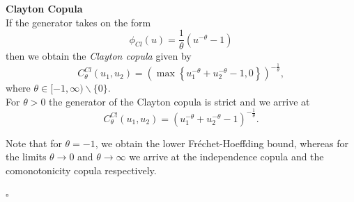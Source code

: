 \textbf{Clayton Copula}\\
If the generator takes on the form
\begin{equation}
\phi_{C l}(u)=\frac{1}{\theta}\left(u^{-\theta}-1\right)
\end{equation}
then we obtain the \textit{Clayton copula} given by
\begin{equation}
C_{\theta}^{C l}\left(u_{1}, u_{2}\right)=\left(\max \left\{u_{1}^{-\theta}+u_{2}^{-\theta}-1,0\right\}\right)^{-\frac{1}{\theta}},
\end{equation}
where $\theta \in[-1, \infty) \backslash\{0\}$.\\
For $\theta > 0$ the generator of the Clayton copula is strict and we arrive at 
\begin{equation}
C_{\theta}^{C l}\left(u_{1}, u_{2}\right)= (u_{1}^{-\theta}+u_{2}^{-\theta}-1)^{-\frac{1}{\theta}}.
\end{equation}

Note that for $\theta=-1$, we obtain the lower Fr\'echet-Hoeffding bound, whereas for the limits $\theta \rightarrow 0$ and $\theta \rightarrow \infty$ we arrive at the independence copula and the comonotonicity copula respectively.

\hfill $\square$ \\




